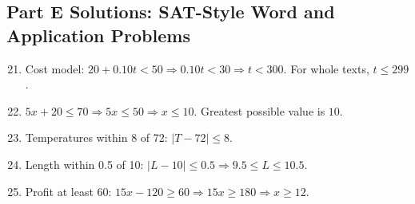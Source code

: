 \documentclass[14pt]{extarticle}
\begin{document}
\subsection*{Part E Solutions: SAT-Style Word and Application Problems}
\begin{enumerate}
    \setcounter{enumi}{20}
    \item Cost model: \(20 + 0.10t < 50 \Rightarrow 0.10t < 30 \Rightarrow t < \boxed{300}\). For whole texts, \(t \le 299\).
    \item \(5x + 20 \le 70 \Rightarrow 5x \le 50 \Rightarrow x \le \boxed{10}\). Greatest possible value is \(10\).
    \item Temperatures within 8 of 72: \(\boxed{|T - 72| \le 8}\).
    \item Length within 0.5 of 10: \(|L - 10| \le 0.5 \Rightarrow \boxed{9.5 \le L \le 10.5}\).
    \item Profit at least 60: \(15x - 120 \ge 60 \Rightarrow 15x \ge 180 \Rightarrow x \ge \boxed{12}\).
\end{enumerate}




\end{document}
